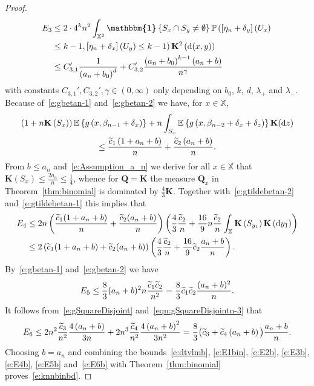 \documentclass[10pt]{amsart}
\theoremstyle{definition}\newtheorem{defi}[theo]{Definition}\newtheorem{rema}[theo]{Remark}\newtheorem{exam}[theo]{Example}\newtheorem{exem}[theo]{Example}\newtheorem{nota}[theo]{Notation}
\newcommand*\bK{\mathbf{K}}
\newcommand{\bQ}{\mathbf{Q}}
\renewcommand*\P{\mathbb{P}}
\newcommand*\X{\mathbb{X}}
\newcommand{\E}{\mathbb{E}}
\newcommand*\md{\mathrm{d}}
\newcommand{\mean}[1] {\E\left\{{#1}\right\}}
\newcommand{\ind}{\boldsymbol{\mathbbm{1}}}
\let\oldtilde\tilde
\renewcommand*{\tilde}[1]{\mathchoice{\widetilde{#1}}{\widetilde{#1}}{\oldtilde{#1}}{\oldtilde{#1}}}
\begin{document}
\begin{proof}
\begin{equation}\label{e:E3b}
\begin{split}
E_3 &\leq 2\cdot 4^k n^2 \int_{\X^2} \ind\left
\{S_{x}\cap S_{y} \neq \emptyset\right\} \P\left(\left[\eta_{n}+\delta_y\right]\left(U_{x}\right)\right. \\
&\left.\leq k-1, \left[\eta_{n}+\delta_x\right]\left(U_{y}\right)\leq k-1\right) \bK^2\left(\md(x,y)\right)\\
&\leq C_{3,1}'\frac{1}{\left(a_n+b_0\right)^d} + C_{3,2}' \frac{\left(a_n+b_0\right)^{k-1}\left(a_n+b\right)}{n^{\gamma}}
\end{split}
\end{equation}
with constants $C_{3,1}',C_{3,2}',\gamma\in(0,\infty)$ only depending on $b_0$, $k$, $d$, $\lambda_+$ and $\lambda_-$. Because of~\eqref{e:gbetan-1} and~\eqref{e:gbetan-2} we have, for $x\in\X$,
\begin{multline*}
\left(1+n\bK\left(S_{x}\right)\right) \mean{g\left(x,\beta_{n-1}+\delta_x\right)} + n \int_{S_{x}} \mean{g\left(x,\beta_{n-2}+\delta_x+\delta_z\right)} \bK(\md z) \\ 
\leq \frac{\tilde{c}_1 \left(1+a_n+ b\right)}{n} + \frac{\tilde{c}_2 \left(a_n + b\right)}{n}.
\end{multline*}
From $b\leq a_n$ and~\eqref{e:Assumption_a_n} we derive for all $x\in\X$ that $\bK(S_x)\leq \tfrac{2a_n}{n}\leq\tfrac{1}{4}$, whence for $\bQ=\bK$ the measure $\bQ_x$ in Theorem~\ref{thm:binomial} is dominated by $\tfrac{4}{3}\bK$. Together with~\eqref{e:gtildebetan-2} and~\eqref{e:gtildebetan-1} this implies that
\begin{equation}\label{e:E4b}
\begin{split}
E_4 & \leq 2n\left(\frac{\tilde{c}_1 (1+a_n+ b)}{n} + \frac{\tilde{c}_2 (a_n + b)}{n} \right) \left(\frac{4}{3} \frac{\tilde{c}_2}{n} + \frac{16}{9} n \frac{\tilde{c}_2}{n} \int_{\X} \bK\left(S_{y_1}\right) \bK\left(\md y_1\right) \right)\\
& \leq 2\left(\tilde{c}_1(1+a_n+ b) + \tilde{c}_2 (a_n + b) \right) \left(\frac{4}{3} \frac{\tilde{c}_2}{n} + \frac{16}{9} \tilde{c}_2 \frac{a_n + b}{n} \right).
\end{split}
\end{equation}
By~\eqref{e:gbetan-1} and~\eqref{e:gbetan-2} we have
\begin{equation}\label{e:E5b}
E_5  \leq \frac{8}{3} (a_n + b)^2 n \frac{\tilde{c}_1\tilde{c}_2}{n^2} = \frac{8}{3} \tilde{c}_1\tilde{c}_2 \frac{(a_n + b)^2}{n}.
\end{equation}
It follows from~\eqref{e:gSquareDisjoint} and~\eqref{eqn:gSquareDisjointn-3} that
\begin{equation}\label{e:E6b}
E_6 \leq 2n^2 \frac{\tilde{c}_3}{n^2} \frac{4\left(a_n + b\right)}{3n} + 2n^3 \frac{\tilde{c}_4}{n^2} \frac{4\left(a_n + b\right)^2}{3n^2} = \frac{8}{3} \big(\tilde{c}_3 + \tilde{c}_4 \left(a_n + b\right) \big) \frac{a_n + b}{n}.
\end{equation}
Choosing $b=a_n$ and combining the bounds~\eqref{e:dtvlmb}, \eqref{e:E1bin}, \eqref{e:E2b}, \eqref{e:E3b}, \eqref{e:E4b}, \eqref{e:E5b} and~\eqref{e:E6b} with Theorem~\ref{thm:binomial} proves~\eqref{e:knnbinbd}.
\end{proof}
\end{document}
